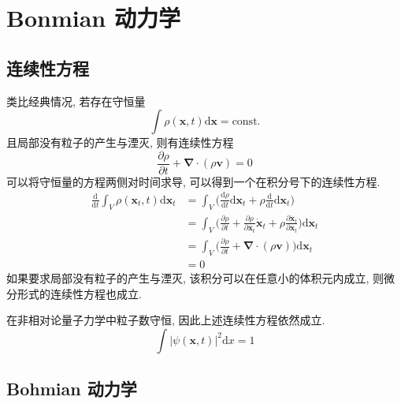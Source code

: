 \chapter{Bonmian 动力学}
    \section{连续性方程}

        类比经典情况, 若存在守恒量
        \begin{equation}
            \int \rho (\bm{x},t) \mathrm{d} \bm{x} = \text{const.}
        \end{equation}
        且局部没有粒子的产生与湮灭, 则有连续性方程
        \begin{equation}
            \frac {\partial \rho}{\partial t} + \bm{\nabla} \cdot (\rho \bm{v}) = 0
        \end{equation}
        可以将守恒量的方程两侧对时间求导, 可以得到一个在积分号下的连续性方程. 
        \begin{equation}\begin{aligned}
            \frac{\mathrm{d}}{\mathrm{d}t} \int_V \rho (\bm{x}_t, t) \mathrm{d} \bm{x}_t
            & = \int_V \bigg( \frac{\mathrm{d}\rho}{\mathrm{d}t} \mathrm{d} \bm{x}_t + \rho \frac{\mathrm{d}}{\mathrm{d}t} \mathrm{d} \bm{x}_t\bigg) \\
            & = \int_V \bigg( \frac{\partial \rho}{\partial t} + \frac{\partial \rho}{\partial \bm{x}_t}\bm{\dot{x}}_t + \rho \frac{\partial \bm{\dot{x}}_t}{\partial \bm{x}_t} \bigg) \mathrm{d} \bm{x}_t \\
            & = \int_V \bigg( \frac {\partial \rho}{\partial t} + \bm{\nabla} \cdot (\rho \bm{v}) \bigg) \mathrm{d} \bm{x}_t \\
            & = 0 
        \end{aligned}\end{equation}
        如果要求局部没有粒子的产生与湮灭, 该积分可以在任意小的体积元内成立, 则微分形式的连续性方程也成立. 

        在非相对论量子力学中粒子数守恒, 因此上述连续性方程依然成立. 
        \begin{equation}
            \int |\psi(\bm{x},t)|^2 \mathrm{d}x = 1
        \end{equation}

    \section{Bohmian 动力学}

